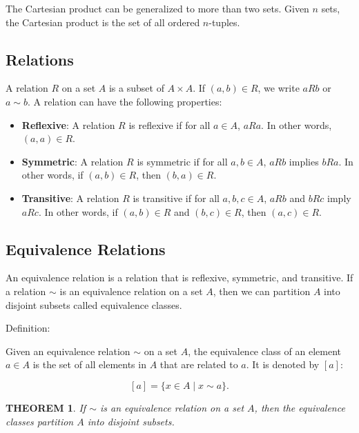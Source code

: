 \documentclass{report}
\newtheorem{definition}{\textcolor{blue}{Definition}}
\newtheorem{theorem}{THEOREM}[chapter]
\begin{document}
The Cartesian product can be generalized to more than two sets. Given $n$ sets, the Cartesian product is the set of all ordered $n$-tuples.

\subsection{Relations}
A relation $R$ on a set $A$ is a subset of $A \times A$. If $(a, b) \in R$, we write $aRb$ or $a \sim b$. A relation can have the following properties:

\begin{itemize}
\item \textbf{Reflexive}: A relation $R$ is reflexive if for all $a \in A$, $aRa$. In other words, $(a, a) \in R$.
\item \textbf{Symmetric}: A relation $R$ is symmetric if for all $a, b \in A$, $aRb$ implies $bRa$. In other words, if $(a, b) \in R$, then $(b, a) \in R$.
\item \textbf{Transitive}: A relation $R$ is transitive if for all $a, b, c \in A$, $aRb$ and $bRc$ imply $aRc$. In other words, if $(a, b) \in R$ and $(b, c) \in R$, then $(a, c) \in R$.
\end{itemize}

\subsection{Equivalence Relations}
An equivalence relation is a relation that is reflexive, symmetric, and transitive. If a relation $\sim$ is an equivalence relation on a set $A$, then we can partition $A$ into disjoint subsets called equivalence classes.

Definition:

Given an equivalence relation $\sim$ on a set $A$, the equivalence class of an element $a \in A$ is the set of all elements in $A$ that are related to $a$. It is denoted by $[a]$:

\[
[a] = \{x \in A \mid x \sim a\}.
\]


\begin{theorem}
If $\sim$ is an equivalence relation on a set $A$, then the equivalence classes partition $A$ into disjoint subsets.
\end{theorem}

\end{document}
